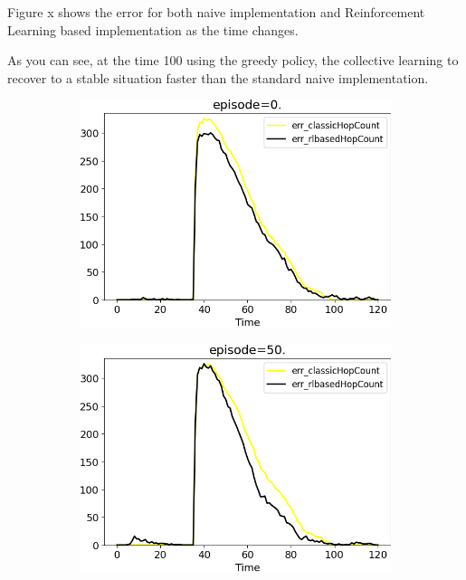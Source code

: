 \documentclass[
  twocolumn,
]{ceurart}
\begin{document}
Figure x shows the error for both naive implementation and Reinforcement Learning based implementation as the time changes.

As you can see, at the time 100 using the greedy policy, the collective learning to recover to a stable situation
faster than the standard naive implementation.

\begin{figure}
  \centering
  \begin{subfigure}[b]{0.3\textwidth}
      \centering
      \includegraphics[width=\textwidth]{img/1}
      \label{fig:y equals x}
  \end{subfigure}
  \hfill
  \begin{subfigure}[b]{0.3\textwidth}
      \centering
      \includegraphics[width=\textwidth]{img/50}

\end{subfigure}
\end{figure}
\end{document}
